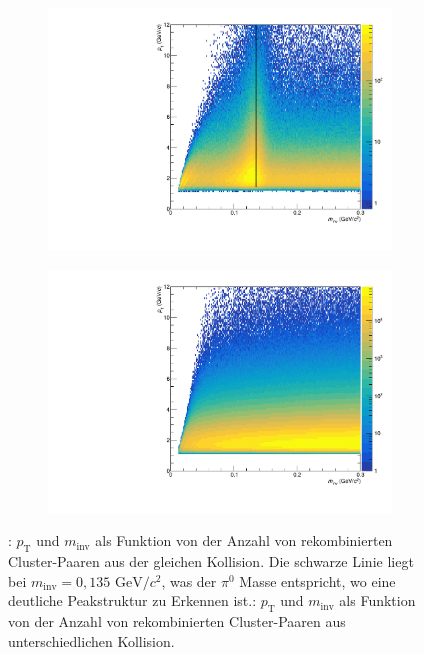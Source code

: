 \documentclass[11pt]{article}
\begin{document}
\begin{figure}[tbp] \label{figInvMassPt}
	\centering
	\begin{subfigure}{.5\textwidth}
		\centering
		\includegraphics[width=.95\linewidth]{hInvMass_pT_Signal.pdf}
		\caption{}
		\label{figInvMassPt_a}
	\end{subfigure}%
	\begin{subfigure}{.5\textwidth}
		\centering
		\includegraphics[width=.95\linewidth]{hInvMass_pT_Bkg.pdf}
		\caption{}
		\label{figInvMassPt_b}
	\end{subfigure}
	\caption{: $p_\text{T}$ und $m_\text{inv}$ als Funktion von der Anzahl von rekombinierten  Cluster-Paaren aus der gleichen Kollision. Die schwarze Linie liegt bei $m_{\text{inv}}=0,135\text{ GeV/}c^{2}$, was der $\pi^{0}$ Masse entspricht, wo eine deutliche Peakstruktur zu Erkennen ist.: $p_\text{T}$ und $m_\text{inv}$ als Funktion von der Anzahl von rekombinierten  Cluster-Paaren aus unterschiedlichen Kollision.}
\end{figure}
\end{document}
